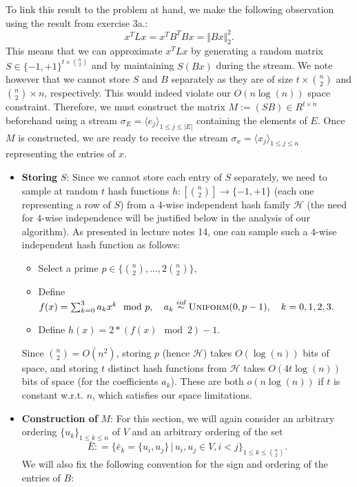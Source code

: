 \documentclass[10pt,usenames,dvipsnames]{article}
\newenvironment{exercise}[2][Exercise]{\begin{trivlist}
  \item[\hskip \labelsep {\bfseries #1}\hskip \labelsep {\bfseries #2.}]}{\end{trivlist}}
\begin{document}
\begin{exercise}{3b}
To link this result to the problem at hand, we make the following observation using the result from exercise 3a.:
$$
x^T L x = x^T B^T B x = \Vert B x \Vert_2^2.
$$
This means that we can approximate $x^T L x $ by generating a random matrix $S\in \{-1, +1\}^{t\times \binom{n}{2}}$ and by maintaining $S (Bx)$ during the stream. We note however that we cannot store $S$ and $B$ separately as they are of size $t\times \binom{n}{2}$ and $\binom{n}{2}\times n$, respectively. This would indeed violate our $O(n\log(n))$ space constraint. Therefore, we must construct the matrix $M:= (SB)\in R^{t\times n}$ beforehand using a stream $\sigma_E=\langle e_j \rangle_{1\leq j \leq |E|}$ containing the elements of $E$. Once $M$ is constructed, we are ready to receive the stream $\sigma_x=\langle x_j\rangle_{1\leq j \leq n}$ representing the entries of $x$.
\begin{itemize}
	\item \textbf{Storing} $S$: Since we cannot store each entry of $S$ separately, we need to sample at random $t$ hash functions $h: [\binom{n}{2}] \to \{-1, +1\}$
	 (each one representing a row of $S$) from a $4$-wise independent hash family $\mathcal{H}$ (the need for $4$-wise 
	 independence will be justified below in the analysis of our algorithm). As presented in lecture notes 14, one can sample such a $4$-wise independent hash function as follows:
	 \begin{itemize}
	 	\item Select a prime $p \in \{\binom{n}{2},...,2\binom{n}{2}\}$,
		\item Define $f(x) = \sum_{k=0}^3 a_k x^k \mod p, 
			\quad a_k \overset{iid}{\sim} \mbox{\textsc{Uniform}}(0,p-1), \quad k=0,1,2,3.$
		\item Define $h(x) = 2*(f(x) \mod 2 )-1$.
	\end{itemize}
	Since $\binom{n}{2} = O(n^2)$, storing $p$ (hence $\mathcal{H}$) takes $O(\log(n))$ bits of space, and storing $t$ distinct hash functions from $\mathcal{H}$ takes $O(4t\log(n))$ bits of space (for the coefficients $a_k$). These are both $o(n\log(n))$ if $t$ is constant w.r.t. $n$, which satisfies our space limitations. 
	\item \textbf{Construction of} $M$: For this section, we will again consider an arbitrary ordering 
	$\{u_k \}_{1\leq k \leq n}$ of $V$ and an arbitrary ordering of the set 
	$$\bar{E} : = \{\bar{e}_k = \{u_i, u_j\} \, | \, u_i, u_j \in V, i<j\}_{1\leq k \leq \binom{n}{2}}.$$ 
	We will also fix the following convention for the sign and ordering of the entries of $B$:

\end{itemize}
\end{exercise}
\end{document}
